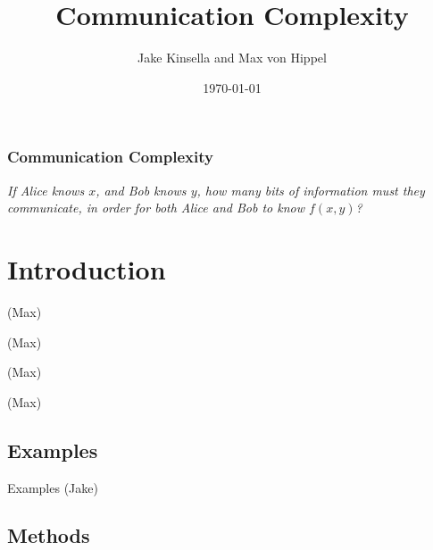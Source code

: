 \documentclass{beamer}
\title{Communication Complexity}
\author{Jake Kinsella and Max von Hippel}
\institute{Northeastern University}
\date{\today}
\begin{document}
\frame{\titlepage}

\begin{frame}
\frametitle{Communication Complexity}
\emph{If Alice knows $x$, and Bob knows $y$, how many bits of information must they communicate, in order for both Alice and Bob to know $f(x, y)$?}
\end{frame}

\begin{frame}
\tableofcontents
\end{frame}


\section{Introduction}

\begin{frame}{(Max)}

\end{frame}

\begin{frame}{(Max)}

\end{frame}

\begin{frame}{(Max)}

\end{frame}

\begin{frame}{(Max)}

\end{frame}

\subsection{Examples}

\begin{frame}{Examples (Jake)}
\TODO
\end{frame}

\subsection{Methods}
\end{document}
